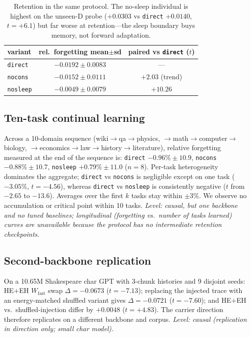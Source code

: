 \documentclass{article} %
\begin{document}
\begin{table}[h]
\centering
\small
\begin{tabular}{lcc}
\toprule
variant & rel.\ forgetting mean$\pm$sd & paired vs \texttt{direct} ($t$) \\
\midrule
\texttt{direct} & $-0.0192 \pm 0.0083$ & --- \\
\texttt{nocons} & $-0.0152 \pm 0.0111$ & $+2.03$ (trend) \\
\texttt{nosleep} & $-0.0049 \pm 0.0079$ & $\mathbf{+10.26}$ \\
\bottomrule
\end{tabular}
\caption{Retention in the same protocol. The no-sleep individual is highest on the unseen-D probe ($+0.0303$ vs \texttt{direct} $+0.0140$, $t{=}{+}6.1$) but far worse at retention---the sleep boundary buys memory, not forward adaptation.}
\label{tab:retention}
\end{table}

\subsection{Ten-task continual learning}
\label{sec:t10}

Across a 10-domain sequence (\mbox{wiki$\to$qa$\to$physics}, \mbox{$\to$math$\to$computer$\to$biology}, \mbox{$\to$economics$\to$law$\to$history$\to$literature}), relative forgetting measured at the end of the sequence is: \texttt{direct} $-0.96\%\pm10.9$, \texttt{nocons} $-0.88\%\pm10.7$, \texttt{nosleep} $+0.79\%\pm11.0$ ($n{=}8$). Per-task heterogeneity dominates the aggregate; \texttt{direct} vs \texttt{nocons} is negligible except on one task ($-3.05\%$, $t{=}{-}4.56$), whereas \texttt{direct} vs \texttt{nosleep} is consistently negative ($t$ from $-2.65$ to $-13.6$). Averages over the first $k$ tasks stay within $\pm3\%$. We observe no accumulation or critical point within 10 tasks. \emph{Level: causal, but one backbone and no tuned baselines; longitudinal (forgetting vs.\ number of tasks learned) curves are unavailable because the protocol has no intermediate retention checkpoints.}

\subsection{Second-backbone replication}
\label{sec:second}

On a 10.65M Shakespeare char GPT with 3-chunk histories and 9 disjoint seeds: HE$+$EH $W_{\mathrm{fast}}$ swap $\Delta = -0.0673$ ($t{=}{-}7.13$); replacing the injected trace with an energy-matched shuffled variant gives $\Delta = -0.0721$ ($t{=}{-}7.60$); and HE$+$EH vs.\ shuffled-injection differ by $+0.0048$ ($t{=}{+}4.83$). The carrier direction therefore replicates on a different backbone and corpus. \emph{Level: causal (replication in direction only; small char model).}
\end{document}
